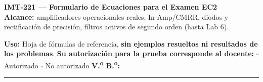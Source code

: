\documentclass[10pt, a4paper]{article}
\begin{document}
\begin{center}
    {\large\textbf{\textcolor{ucbblue}{IMT-221 --- Formulario de Ecuaciones para el Examen EC2}}}\\[0.08cm]
    {\footnotesize\textbf{Alcance:} amplificadores operacionales reales, In-Amp/CMRR, diodos y rectificación de precisión, filtros activos de segundo orden (hasta Lab 6).}
\end{center}

\begin{tcolorbox}[colback=neutralbg, colframe=ucbblue!70, boxrule=0.6pt, arc=1.2mm, left=6pt, right=6pt, top=4pt, bottom=4pt]
    \footnotesize
    \textbf{Uso:} Hoja de fórmulas de referencia, \textbf{sin ejemplos resueltos ni resultados de los problemas}. \textbf{Su autorización para la prueba corresponde al docente:} \quad $\square$ Autorizado \quad $\square$ No autorizado \qquad \textbf{V.\textsuperscript{o} B.\textsuperscript{o}:} \rule{3.0cm}{0.4pt}
\end{tcolorbox}
\end{document}
